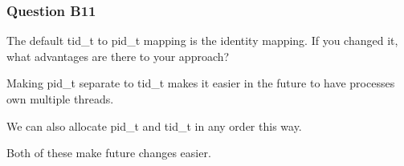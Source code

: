 \subsubsection*{Question B11} %
The default tid\_t to pid\_t mapping is the identity mapping. If you changed it, what advantages are there to your approach?

Making pid\_t separate to tid\_t makes it easier in the future to have processes own multiple threads.

We can also allocate pid\_t and tid\_t in any order this way.

Both of these make future changes easier.

